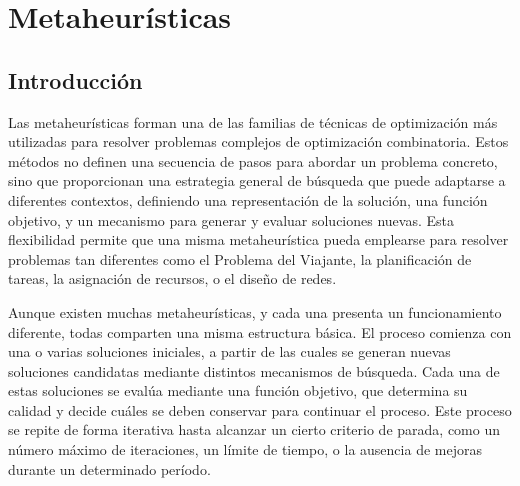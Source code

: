 %
%
%
% 
%
%
%
%

\chapter{Metaheurísticas}
\label{cha:metah}

\section{Introducción}
\label{sec:intro}

Las metaheurísticas forman una de las familias de técnicas de optimización más utilizadas para resolver problemas complejos de 
optimización combinatoria. Estos métodos no definen una secuencia de pasos para abordar un problema concreto, sino que 
proporcionan una estrategia general de búsqueda que puede adaptarse a diferentes contextos, definiendo una representación de la 
solución, una función objetivo, y un mecanismo para generar y evaluar soluciones nuevas. Esta flexibilidad permite que una misma
metaheurística pueda emplearse para resolver problemas tan diferentes como el Problema del Viajante, la planificación de tareas, 
la asignación de recursos, o el diseño de redes.

Aunque existen muchas metaheurísticas, y cada una presenta un funcionamiento diferente, todas comparten una misma estructura 
básica. El proceso comienza con una o varias soluciones iniciales, a partir de las cuales se generan nuevas soluciones candidatas
mediante distintos mecanismos de búsqueda. Cada una de estas soluciones se evalúa mediante una función objetivo, que determina 
su calidad y decide cuáles se deben conservar para continuar el proceso. Este proceso se repite de forma iterativa hasta alcanzar
un cierto criterio de parada, como un número máximo de iteraciones, un límite de tiempo, o la ausencia de mejoras durante un 
determinado período. 

